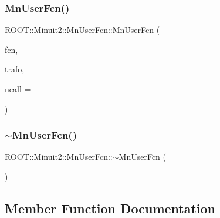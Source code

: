 \subsubsection{\texorpdfstring{MnUserFcn()}{MnUserFcn()}\hspace{0.1cm}{\footnotesize\ttfamily [3/3]}}
{\footnotesize\ttfamily R\+O\+O\+T\+::\+Minuit2\+::\+Mn\+User\+Fcn\+::\+Mn\+User\+Fcn (\begin{DoxyParamCaption}\item[{const \mbox{\hyperlink{classROOT_1_1Minuit2_1_1FCNBase}{F\+C\+N\+Base}} \&}]{fcn,  }\item[{const \mbox{\hyperlink{classROOT_1_1Minuit2_1_1MnUserTransformation}{Mn\+User\+Transformation}} \&}]{trafo,  }\item[{int}]{ncall = {} }\end{DoxyParamCaption})\hspace{0.3cm}{\ttfamily [inline]}}

\mbox{\label{classROOT_1_1Minuit2_1_1MnUserFcn_afa175648109f4cec5ab7dd274d0b0e75}} 
\subsubsection{\texorpdfstring{$\sim$MnUserFcn()}{~MnUserFcn()}\hspace{0.1cm}{\footnotesize\ttfamily [3/3]}}
{\footnotesize\ttfamily R\+O\+O\+T\+::\+Minuit2\+::\+Mn\+User\+Fcn\+::$\sim$\+Mn\+User\+Fcn (\begin{DoxyParamCaption}{ }\end{DoxyParamCaption})\hspace{0.3cm}{\ttfamily [inline]}}



\subsection{Member Function Documentation}
\mbox{\label{classROOT_1_1Minuit2_1_1MnUserFcn_a7f25ae05f1caca57bd8d1e83b9643dfe}} 
